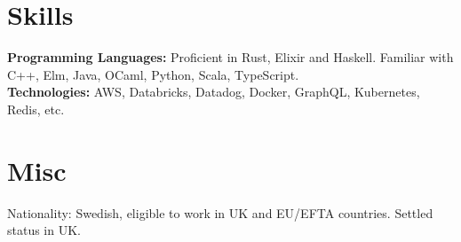 \documentclass[margin,line]{res}
\begin{document}
\begin{resume}
    \section{\sc Skills}

     {\bf Programming Languages:} Proficient in Rust, Elixir and Haskell. Familiar
    with C++, Elm, Java, OCaml, Python, Scala, TypeScript.\\
    {\bf Technologies:} AWS, Databricks, Datadog, Docker, GraphQL, Kubernetes, Redis,
    etc.

    \section{\sc Misc}

    Nationality: Swedish, eligible to work in UK and EU/EFTA countries. Settled status in UK.

\end{resume}
\end{document}

